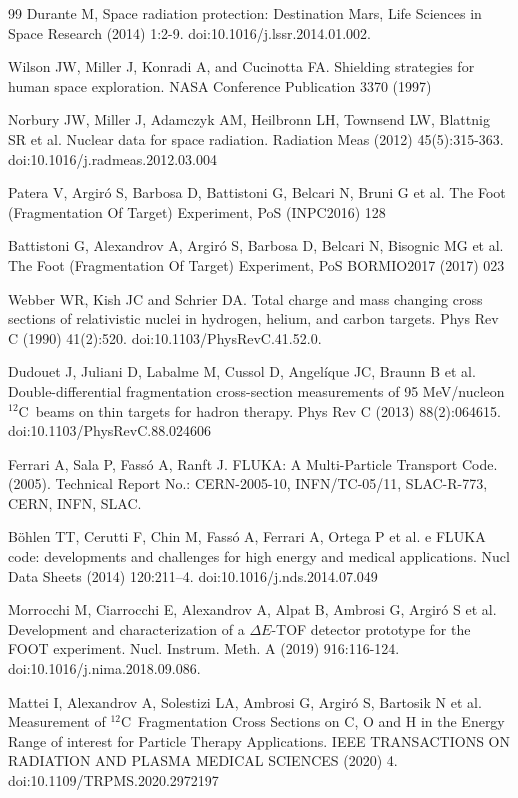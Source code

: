 \documentclass[utf8]{frontiersFPHY} %
\newcommand{\twC}{$^{\mathrm{12}}$C~}
\begin{document}
\begin{thebibliography}{99}
 Durante M, Space radiation protection: Destination Mars, Life Sciences in Space Research (2014) 1:2-9. doi:10.1016/j.lssr.2014.01.002.

 Wilson JW, Miller J, Konradi A, and Cucinotta FA. Shielding strategies for human space exploration. NASA Conference Publication 3370 (1997)

 Norbury JW, Miller J, Adamczyk AM, Heilbronn LH, Townsend LW, Blattnig SR et al. Nuclear data for space radiation. Radiation Meas (2012) 45(5):315-363. doi:10.1016/j.radmeas.2012.03.004

 Patera V, Argir\'o S, Barbosa D, Battistoni G, Belcari N, Bruni G et al. The Foot (Fragmentation Of Target) Experiment, PoS (INPC2016) 128

 Battistoni G, Alexandrov A, Argir\'o S, Barbosa D, Belcari N, Bisognic MG et al. The Foot (Fragmentation Of Target) Experiment, PoS BORMIO2017 (2017) 023

 Webber WR, Kish JC and Schrier DA. Total charge and mass changing cross sections of relativistic nuclei in hydrogen, helium, and carbon targets. Phys Rev C (1990) 41(2):520. doi:10.1103/PhysRevC.41.52.0.

 Dudouet J, Juliani D, Labalme M, Cussol D, Angel\'ique JC, Braunn B et al. Double-differential fragmentation cross-section measurements of 95 MeV/nucleon \twC beams on thin targets for hadron therapy. Phys Rev C (2013) 88(2):064615. doi:10.1103/PhysRevC.88.024606

 Ferrari A, Sala P, Fass\'o A, Ranft J. FLUKA: A Multi-Particle Transport Code. (2005). Technical Report No.: CERN-2005-10, INFN/TC-05/11, SLAC-R-773, CERN, INFN, SLAC.

 B\"{o}hlen TT, Cerutti F, Chin M, Fass\'o A, Ferrari A, Ortega P et al.  e FLUKA code: developments and challenges for high energy and medical applications. Nucl Data Sheets (2014) 120:211–4. doi:10.1016/j.nds.2014.07.049

 Morrocchi M, Ciarrocchi E, Alexandrov A, Alpat B, Ambrosi G, Argir\'o S et al. Development and characterization of a $\Delta E$-TOF detector prototype for the FOOT experiment. Nucl. Instrum. Meth. A (2019) 916:116-124. doi:10.1016/j.nima.2018.09.086.

 Mattei I, Alexandrov A, Solestizi LA, Ambrosi G, Argir\'o S, Bartosik N et al. Measurement of \twC Fragmentation Cross Sections on C, O and H in the Energy Range of interest for Particle Therapy Applications. IEEE TRANSACTIONS ON RADIATION AND PLASMA MEDICAL SCIENCES (2020) 4. doi:10.1109/TRPMS.2020.2972197


\end{thebibliography}
\end{document}
